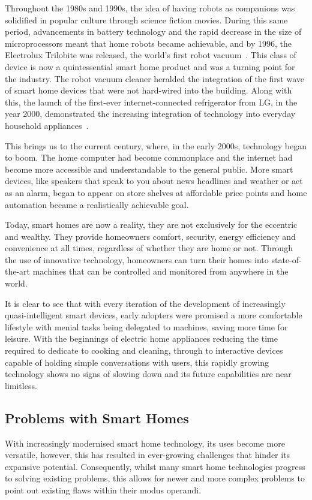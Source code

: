 Throughout the 1980s and 1990s, the idea of having robots as companions was solidified in popular culture through science fiction movies.
During this same period, advancements in battery technology and the rapid decrease in the size of microprocessors meant that home robots became achievable, and by 1996, the Electrolux Trilobite was released, the world's first robot vacuum~\cite{Vacu}.
This class of device is now a quintessential smart home product and was a turning point for the industry.
The robot vacuum cleaner heralded the integration of the first wave of smart home devices that were not hard-wired into the building.
Along with this, the launch of the first-ever internet-connected refrigerator from LG, in the year 2000, demonstrated the increasing integration of technology into everyday household appliances~\cite{Maha17}.

This brings us to the current century, where, in the early 2000s, technology began to boom.
The home computer had become commonplace and the internet had become more accessible and understandable to the general public.
More smart devices, like speakers that speak to you about news headlines and weather or act as an alarm, began to appear on store shelves at affordable price points and home automation became a realistically achievable goal.

Today, smart homes are now a reality, they are not exclusively for the eccentric and wealthy.
They provide homeowners comfort, security, energy efficiency and convenience at all times, regardless of whether they are home or not.
Through the use of innovative technology, homeowners can turn their homes into state-of-the-art machines that can be controlled and monitored from anywhere in the world.

It is clear to see that with every iteration of the development of increasingly quasi-intelligent smart devices, early adopters were promised a more comfortable lifestyle with menial tasks being delegated to machines, saving more time for leisure.
With the beginnings of electric home appliances reducing the time required to dedicate to cooking and cleaning, through to interactive devices capable of holding simple conversations with users, this rapidly growing technology shows no signs of slowing down and its future capabilities are near limitless.

\subsection{Problems with Smart Homes}
With increasingly modernised smart home technology, its uses become more versatile, however, this has resulted in ever-growing challenges that hinder its expansive potential. Consequently, whilst many smart home technologies progress to solving existing problems, this allows for newer and more complex problems to point out existing flaws within their modus operandi.

